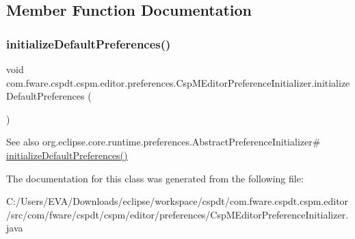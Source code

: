 \subsection{Member Function Documentation}
\mbox{\label{classcom_1_1fware_1_1cspdt_1_1cspm_1_1editor_1_1preferences_1_1_csp_m_editor_preference_initializer_a0809ddbc5a8679661226f3e1d0988995}} 
\subsubsection{\texorpdfstring{initialize\+Default\+Preferences()}{initializeDefaultPreferences()}}
{\footnotesize\ttfamily void com.\+fware.\+cspdt.\+cspm.\+editor.\+preferences.\+Csp\+M\+Editor\+Preference\+Initializer.\+initialize\+Default\+Preferences (\begin{DoxyParamCaption}{ }\end{DoxyParamCaption})\hspace{0.3cm}{\ttfamily [inline]}}

\begin{DoxySeeAlso}{See also}
org.\+eclipse.\+core.\+runtime.\+preferences.\+Abstract\+Preference\+Initializer\# \hyperlink{classcom_1_1fware_1_1cspdt_1_1cspm_1_1editor_1_1preferences_1_1_csp_m_editor_preference_initializer_a0809ddbc5a8679661226f3e1d0988995}{initialize\+Default\+Preferences()} 
\end{DoxySeeAlso}


The documentation for this class was generated from the following file\+:\begin{DoxyCompactItemize}
\item 
C\+:/\+Users/\+E\+V\+A/\+Downloads/eclipse/workspace/cspdt/com.\+fware.\+cspdt.\+cspm.\+editor/src/com/fware/cspdt/cspm/editor/preferences/Csp\+M\+Editor\+Preference\+Initializer.\+java\end{DoxyCompactItemize}
